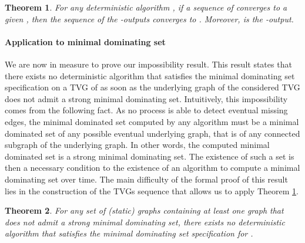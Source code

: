 \documentclass{article}
\newtheorem{theorem}{Theorem}
\begin{document}
\begin{theorem}\label{th:convergence}
For any deterministic algorithm , if a sequence  of  converges to a given , then the sequence  of the -outputs converges to . Moreover,  is the -output.
\end{theorem}

\paragraph{Application to minimal dominating set}

We are now in measure to prove our impossibility result. This result states that there exists no deterministic algorithm that satisfies the minimal dominating set specification on a TVG of  as soon as the underlying graph of the considered TVG does not admit a strong minimal dominating set. Intuitively, this impossibility comes from the following fact. As no process is able to detect eventual missing edges, the minimal dominated set computed by any algorithm must be a minimal dominated set of any possible eventual underlying graph, that is of any connected subgraph of the underlying graph. In other words, the computed minimal dominated set is a strong minimal dominating set. The existence of such a set is then a necessary condition to the existence of an algorithm to compute a minimal dominating set over time. The main difficulty of the formal proof of this result lies in the construction of the TVGs sequence that allows us to apply Theorem \ref{th:convergence}.

\begin{theorem}\label{th:MDSimp}
For any set of (static) graphs  containing at least one graph that does not admit a strong minimal dominating set, there exists no deterministic algorithm that satisfies the minimal dominating set specification for .
\end{theorem}
\end{document}
